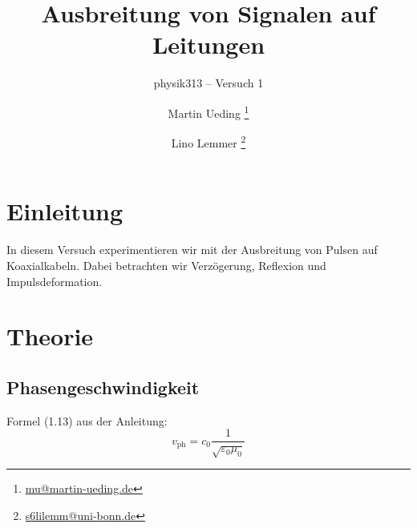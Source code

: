 




\subject{Praktikumsprotokoll}
\title{Ausbreitung von Signalen auf Leitungen}
\subtitle{physik313 – Versuch 1}
\author{
	Martin Ueding \footnote{\href{mailto:mu@martin-ueding.de}{mu@martin-ueding.de}}
	\and
	Lino Lemmer \footnote{\href{mailto:s6lilemm@uni-bonn.de}{s6lilemm@uni-bonn.de}}
}



\maketitle

\tableofcontents
\newpage


\section{Einleitung}

In diesem Versuch experimentieren wir mit der Ausbreitung von Pulsen auf
Koaxialkabeln. Dabei betrachten wir Verzögerung, Reflexion und
Impulsdeformation.


\section{Theorie}

\subsection{Phasengeschwindigkeit}

Formel (1.13) aus der Anleitung:
\begin{equation}
	\label{eq:1.13}
	v_\text{ph} = c_0 \frac{1}{\sqrt{\varepsilon_0 \mu_0}}
\end{equation}

